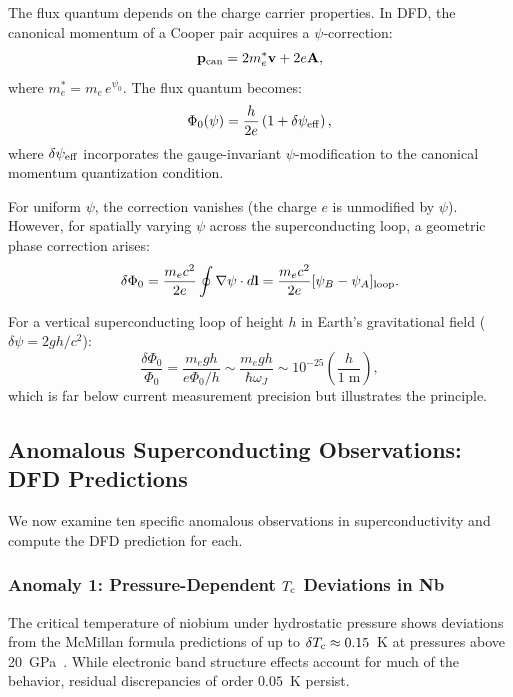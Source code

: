 \documentclass[aps,prb,twocolumn,superscriptaddress,floatfix,nofootinbib,longbibliography]{revtex4-2}
\newcommand{\Tc}{T_{\rm c}}
\begin{document}
The flux quantum depends on the charge carrier properties.  In DFD, the
canonical momentum of a Cooper pair acquires a $\psi$-correction:
\begin{equation}
\mathbf{p}_{\rm can} = 2m_e^*\mathbf{v} + 2e\mathbf{A},
\label{eq:p-can}
\end{equation}
where $m_e^* = m_e\,e^{\psi_0}$.  The flux quantum becomes:
\begin{equation}
\Phi_0(\psi) = \frac{h}{2e}\left(1 + \delta\psi_{\rm eff}\right),
\label{eq:flux-psi}
\end{equation}
where $\delta\psi_{\rm eff}$ incorporates the gauge-invariant
$\psi$-modification to the canonical momentum quantization condition.

For uniform $\psi$, the correction vanishes (the charge $e$ is unmodified
by $\psi$).  However, for spatially varying $\psi$ across the
superconducting loop, a geometric phase correction arises:
\begin{equation}
\delta\Phi_0 = \frac{m_e c^2}{2e}\oint \nabla\psi\cdot d\mathbf{l}
= \frac{m_e c^2}{2e}[\psi_B - \psi_A]_{\rm loop}.
\label{eq:flux-geo}
\end{equation}

For a vertical superconducting loop of height $h$ in Earth's
gravitational field ($\delta\psi = 2gh/c^2$):
\begin{equation}
\frac{\delta\Phi_0}{\Phi_0} = \frac{m_e g h}{e\Phi_0/h}
\sim \frac{m_e g h}{\hbar\omega_J}
\sim 10^{-25}\left(\frac{h}{1\;\text{m}}\right),
\label{eq:flux-earth}
\end{equation}
which is far below current measurement precision but illustrates the
principle.

\subsection{Anomalous Superconducting Observations: DFD Predictions}

We now examine ten specific anomalous observations in superconductivity
and compute the DFD prediction for each.

\subsubsection{Anomaly 1: Pressure-Dependent $\Tc$ Deviations in Nb}

The critical temperature of niobium under hydrostatic pressure shows
deviations from the McMillan formula predictions of up to
$\delta\Tc \approx 0.15$~K at pressures above
20~GPa~\cite{Struzhkin1997}.  While electronic band structure effects
account for much of the behavior, residual discrepancies of order
$0.05$~K persist.
\end{document}
